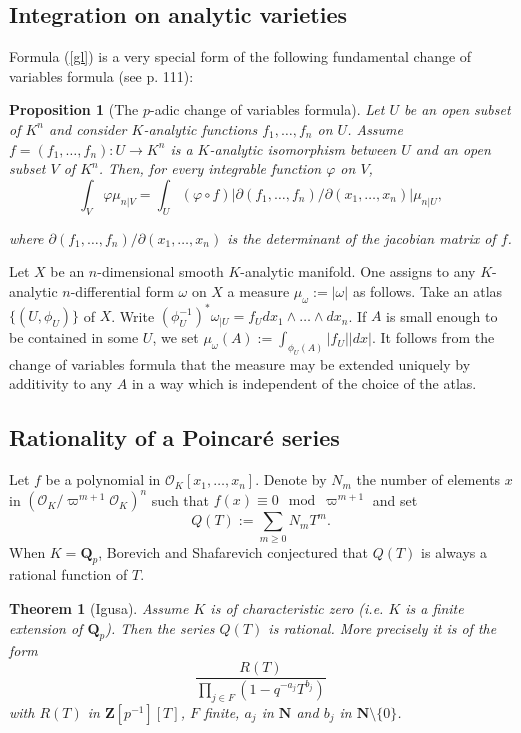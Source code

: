 \documentclass[english,12pt]{amsart}
\def\NN{{\mathbf N}}
\def\QQ{{\mathbf Q}}
\def\ZZ{{\mathbf Z}}
\def\cO{{\mathcal O}}
\newtheorem{theorem}[subsubsection]{Theorem}
\newtheorem{prop}[subsubsection]{Proposition}
\theoremstyle{definition}
\theoremstyle{remark}
\theoremstyle{plain}
\numberwithin{equation}{subsection}
\def\NN{{\mathbf N}}
\def\QQ{{\mathbf Q}}
\def\ZZ{{\mathbf Z}}
\def\cO{{\mathcal O}}
\begin{document}
\subsection{Integration on analytic varieties}Formula (\ref{gl}) is a very special form of the following fundamental change of variables
formula (see \cite{igusabook} p. 111):


\begin{prop}[The $p$-adic change of variables formula]\label{pcvf}
Let $U$ be an open subset of $K^n$
and consider  $K$-analytic functions $f_1, \dots, f_n$
on $U$. Assume
$f = (f_1, \dots, f_n) : U \rightarrow K^n$
is a  $K$-analytic isomorphism between
$U$ and an open subset $V$ of  $K^n$. 
Then,
for every integrable function $\varphi$ on $V$,
$$
\int_V \varphi \mu_{n \vert V}
=
\int_U (\varphi \circ f)
\vert \partial (f_1, \dots, f_n) / \partial (x_1, \dots, x_n) \vert
\mu_{n \vert U},
$$

where $\partial (f_1, \dots, f_n) / \partial (x_1, \dots, x_n)$
is the determinant of the jacobian matrix of $f$.
\end{prop}

Let $X$ be an $n$-dimensional smooth $K$-analytic manifold.
One assigns to any $K$-analytic $n$-differential form $\omega$
on $X$ a measure $\mu_{\omega}:= \vert \omega \vert$ as follows.
Take an atlas $\{(U, \phi_U)\}$ of $X$. Write
$(\phi_U^{-1})^* \omega_{\vert U} = f_U dx_1 \wedge \dots \wedge dx_n$.
If $A$ is small enough to be contained in some $U$,
we set $\mu_{\omega} (A) := \int_{\phi_U (A)} \vert f_U \vert \vert dx \vert$.
It follows from
the change of variables formula that the measure may be extended uniquely
by additivity to any  $A$ in a way which is
independent of the choice 
of the atlas.

\subsection{Rationality of a Poincar\'e series}\label{ig}Let $f$
be a polynomial in $\cO_K [x_1, \dots, x_n]$.
Denote by
$N_m$
the number of elements $x$
in
$(\cO_K / \varpi^{m + 1} \cO_K)^n$ such that $f (x) \equiv 0 \mod \varpi^{m + 1}$
and set $$Q (T):= \sum_{m \geq 0}N_m T^m.$$
When
$K = \QQ_p$, Borevich and Shafarevich conjectured
that $Q (T)$ 
is always a rational function of $T$.


\begin{theorem}[Igusa]Assume $K$ is of characteristic zero (i.e. 
$K$ is a finite extension of $\QQ_p$). Then the series
$Q (T)$ is rational. More precisely it is of the form
$$\frac{R (T)}{\prod_{j \in F}(1 - q^{-a_j}T^{b_j})}$$
with $R (T)$ in $\ZZ [p^{-1}][T]$, $F$ finite,
$a_j$ in $\NN$ and $b_j$ in $\NN \setminus \{0\}$.
\end{theorem}
\end{document}
